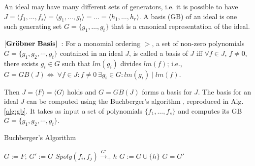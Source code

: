 An ideal may have many different sets of generators, i.e. it is
possible to have $J = \langle f_1, \dots, f_s\rangle = \langle g_1,
\dots, g_t \rangle = \dots = \langle h_1,\dots, h_r\rangle$. A
\Grobner basis (GB) of an ideal is one such generating set
$G=\{g_1, \dots, g_t\}$ that is a canonical representation of the
ideal. 

\begin{Definition}
\label{def:gb}
$\bf{\left[Gr\ddot{o}bner\ Basis\right]}$~\cite{gb_book}: 
For a monomial ordering $>$, a set  of non-zero polynomials $G =
\{g_1,g_2,\cdots,g_t\}$ contained in an ideal $J$, is called a
\Grobner basis of $J$ iff 
$\forall f \in J$, $f\neq 0$, there exists $g_i\in G$ 
such that $lm(g_i)$ divides $lm(f)$; i.e., $G = GB(J)
\Leftrightarrow\  \forall f \in J : f \neq 0 \ \exists g_i \in G :
lm(g_i)\mid lm(f)$.  
\end{Definition}

Then $J = \langle F \rangle = \langle G \rangle$ holds and $G=GB(J)$
forms a basis for $J$. The \Grobner basis for an ideal $J$ can be
computed using the  Buchberger's algorithm \cite{buchberger_thesis},
reproduced in Alg. \ref{alg:gb}. 
It takes as input a set of polynomials $\{f_1,\dots, f_s\}$ and
computes its GB $G = \{g_1,g_2,\cdots,g_t\}$. 

\begin{algorithm}
\caption {Buchberger's Algorithm}
\label{alg:gb}
\begin{algorithmic}[1]
  \State $G:= F$;
  \Repeat
    \State $G' := G$
      \State $Spoly(f_i, f_j) \stackrel{G'}{\textstyle\longrightarrow}_+h$ 
       \State $G:= G \cup \{h\}$ \EndIf
    \EndFor
  \Until $G = G'$
\end{algorithmic}
\end{algorithm}


